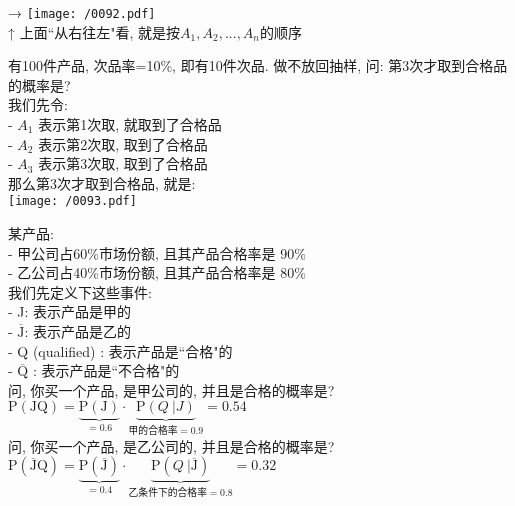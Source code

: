 \documentclass[UTF8]{ctexart}
\begin{document}
	→ \texttt{[image: /0092.pdf]} \\
	↑ 上面``从右往左"看, 就是按$A_1, A_2, ... , A_n$的顺序 \\
	
	
	\begin{myEnvSample}
		有100件产品, 次品率=10\%, 即有10件次品. 做不放回抽样, 问: 第3次才取到合格品的概率是? \\
		我们先令: \\
		- $A_1$ 表示第1次取, 就取到了合格品 \\
		- $A_2$ 表示第2次取, 取到了合格品 \\
		- $A_3$ 表示第3次取, 取到了合格品 \\
		
		那么第3次才取到合格品, 就是:  \\
		\texttt{[image: /0093.pdf]} 		
	\end{myEnvSample}
	
	


\begin{myEnvSample}
	某产品:  \\
	- 甲公司占60\%市场份额, 且其产品合格率是 90\% \\
	- 乙公司占40\%市场份额, 且其产品合格率是 80\% \\
	
	我们先定义下这些事件: \\
	- J: 表示产品是甲的 \\
	- $\overline{\text{J}}$: 表示产品是乙的 \\
	- Q (qualified) : 表示产品是``合格"的 \\
	- $\overline{\text{Q}}$ : 表示产品是``不合格"的 \\
	
    问, 你买一个产品, 是甲公司的, 并且是合格的概率是? \\
    $
    \text{P}\left( \text{JQ} \right) =\underset{=0.6}{\underbrace{\text{P}\left( \text{J} \right) }}\cdot \underset{\text{甲的合格率}=0.9}{\underbrace{\text{P}\left( Q \ | J \right) }}=0.54
    $ \\
    
    问, 你买一个产品, 是乙公司的, 并且是合格的概率是? \\
    $
    \text{P}\left( \overline{\text{J}}\text{Q} \right) =\underset{=0.4}{\underbrace{\text{P}\left( \overline{\text{J}} \right) }}\cdot \underset{\text{乙条件下的合格率}=0.8}{\underbrace{\text{P}\left(Q \ | \overline{\text{J}} \right) }}=0.32
    $      
\end{myEnvSample}
\end{document}
